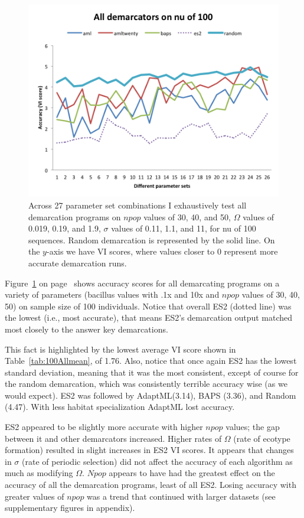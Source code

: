 \begin{figure}[h!]
  \centering
    \includegraphics[scale=0.75]{images/ResultGraphs/ResultGraphs-2}
      \caption[All demarcation graphical accuracy visualization on $nu = 100$.]{Across 27 parameter set combinations I exhaustively test all demarcation programs on $npop$ values of 30, 40, and 50, $\Omega$ values of 0.019, 0.19, and 1.9, $\sigma$ values of 0.11, 1.1, and 11, for nu of 100 sequences. Random demarcation is represented by the solid line. On the $y$-axis we have VI scores, where values closer to 0 represent more accurate demarcation runs.}
    \label{fig:All100}
\end{figure}

Figure~\ref{fig:All100} on page~\pageref{fig:All100} shows accuracy scores for all demarcating programs on a variety of parameters (bacillus values with .1x and 10x and $npop$ values of 30, 40, 50) on sample size of 100 individuals.
Notice that overall ES2 (dotted line) was the lowest (i.e., most accurate), that means ES2's demarcation output matched most closely to the answer key demarcations.

This fact is highlighted by the lowest average VI score shown in Table~\ref{tab:100Allmean}, of 1.76.
Also, notice that once again ES2 has the lowest standard deviation, meaning that it was the most consistent, except of course for the random demarcation, which was consistently terrible accuracy wise (as we would expect).
ES2 was followed by AdaptML(3.14), BAPS (3.36), and Random (4.47).
With less habitat specialization AdaptML lost accuracy.

ES2 appeared to be slightly more accurate with higher $npop$ values; the gap between it and other demarcators increased.
Higher rates of $\Omega$ (rate of ecotype formation) resulted in slight increases in ES2 VI scores.
It appears that changes in $\sigma$ (rate of periodic selection) did not affect the accuracy of each algorithm as much as modifying $\Omega$.
$Npop$ appears to have had the greatest effect on the accuracy of all the demarcation programs, least of all ES2.
Losing accuracy with greater values of $npop$ was a trend that continued with larger datasets (see supplementary figures in appendix).


